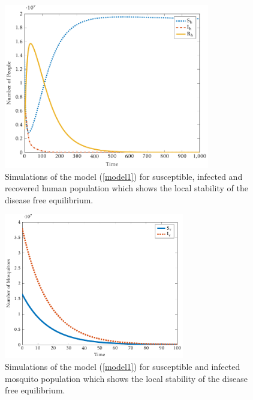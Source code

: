 \documentclass[review]{elsarticle}
\begin{document}
\begin{figure}[htb!]
\centering
\includegraphics[width=0.8\textwidth]{humann}
\caption{Simulations of the model (\ref{model1}) for susceptible, infected and recovered human population which shows the local stability of the disease free equilibrium.}\label{humanplot}
\end{figure}

\begin{figure}[htb!]
\centering
\includegraphics[width=0.7\textwidth]{moquitoo}
\caption{Simulations of the model (\ref{model1}) for susceptible and infected mosquito population which shows the local stability of the disease free equilibrium.}\label{moquitoplot}
\end{figure}
\end{document}
